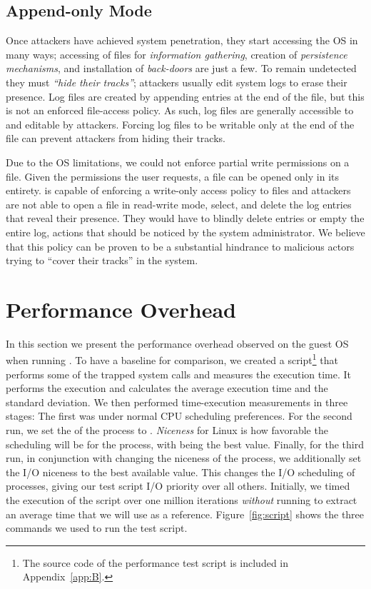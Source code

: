 \subsection{Append-only Mode}

\par Once attackers have achieved system penetration, they start accessing the \ac{OS} in many ways; accessing of files for \emph{information gathering}, creation of \emph{persistence mechanisms}, and installation of \emph{back-doors} are just a few. To remain undetected they must \emph{``hide their tracks''}; attackers usually edit system logs to erase their presence. Log files are created by appending entries at the end of the file, but this is not an enforced file-access policy. As such, log files are generally accessible to and editable by attackers. Forcing log files to be writable only at the end of the file can prevent attackers from hiding their tracks.

\par Due to the \ac{OS} limitations, we could not enforce partial write permissions on a file. Given the permissions the user requests, a file can be opened only in its entirety.  is capable of enforcing a write-only access policy to files and attackers are not able to open a file in read-write mode, select, and delete the log entries that reveal their presence. They would have to blindly delete entries or empty the entire log, actions that should be noticed by the system administrator. We believe that this policy can be proven to be a substantial hindrance to malicious actors trying to ``cover their tracks'' in the system.

\section{Performance Overhead}\label{sec:performance}

In this section we present the performance overhead observed on the guest \ac{OS} when running . To have a baseline for comparison, we created a  script\footnote{The source code of the performance test script is included in Appendix~\ref{app:B}.} that performs some of the trapped system calls and measures the execution time. It performs the execution and calculates the average execution time and the standard deviation. We then performed time-execution measurements in three stages: The first was under normal \ac{CPU} scheduling preferences. For the second run, we set the  of the process to . \emph{Niceness} for Linux is how favorable the scheduling will be for the process, with  being the best value. Finally, for the third run, in conjunction with changing the niceness of the process, we additionally set the \ac{I/O} niceness to the best available value. This changes the \ac{I/O} scheduling of processes, giving our test script \ac{I/O} priority over all others. Initially, we timed the execution of the script over one million iterations \emph{without} running  to extract an average time that we will use as a reference. Figure~\ref{fig:script} shows the three commands we used to run the test script.

